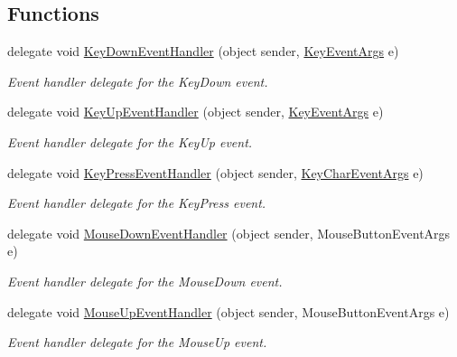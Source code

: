 \subsection*{Functions}
\begin{DoxyCompactItemize}
\item 
delegate void \hyperlink{namespace_tri_devs_1_1_tri_engine2_d_1_1_input_1_1_events_a676fcf6498ddda3a525617b4e6c41857}{Key\-Down\-Event\-Handler} (object sender, \hyperlink{class_tri_devs_1_1_tri_engine2_d_1_1_input_1_1_events_1_1_key_event_args}{Key\-Event\-Args} e)
\begin{DoxyCompactList}\small\item\em Event handler delegate for the Key\-Down event. \end{DoxyCompactList}\item 
delegate void \hyperlink{namespace_tri_devs_1_1_tri_engine2_d_1_1_input_1_1_events_acd6b4f84ea46951afaef10098dc61fd0}{Key\-Up\-Event\-Handler} (object sender, \hyperlink{class_tri_devs_1_1_tri_engine2_d_1_1_input_1_1_events_1_1_key_event_args}{Key\-Event\-Args} e)
\begin{DoxyCompactList}\small\item\em Event handler delegate for the Key\-Up event. \end{DoxyCompactList}\item 
delegate void \hyperlink{namespace_tri_devs_1_1_tri_engine2_d_1_1_input_1_1_events_a93b789b2af13632e9b12c7d7e83e477b}{Key\-Press\-Event\-Handler} (object sender, \hyperlink{class_tri_devs_1_1_tri_engine2_d_1_1_input_1_1_events_1_1_key_char_event_args}{Key\-Char\-Event\-Args} e)
\begin{DoxyCompactList}\small\item\em Event handler delegate for the Key\-Press event. \end{DoxyCompactList}\item 
delegate void \hyperlink{namespace_tri_devs_1_1_tri_engine2_d_1_1_input_1_1_events_af0ece35c3ca19f344c8e2bd95a6a4f17}{Mouse\-Down\-Event\-Handler} (object sender, Mouse\-Button\-Event\-Args e)
\begin{DoxyCompactList}\small\item\em Event handler delegate for the Mouse\-Down event. \end{DoxyCompactList}\item 
delegate void \hyperlink{namespace_tri_devs_1_1_tri_engine2_d_1_1_input_1_1_events_a86567ac2dc0cc1f7a50454c1d4215dd7}{Mouse\-Up\-Event\-Handler} (object sender, Mouse\-Button\-Event\-Args e)
\begin{DoxyCompactList}\small\item\em Event handler delegate for the Mouse\-Up event. \end{DoxyCompactList}\item 

\end{DoxyCompactItemize}
